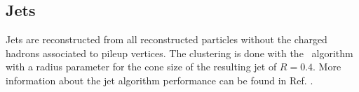 \subsection{Jets}
\label{sec:JetID}
Jets are reconstructed  from all reconstructed particles without the charged hadrons associated to pileup vertices. The clustering is done with the \antikt\ algorithm~\cite{Cacciari:2008gp} with a radius parameter for the cone size of the resulting jet of $R=0.4$. %
More information about the jet algorithm performance can be found in Ref. \cite{CMS-PAS-JME-16-003}.

